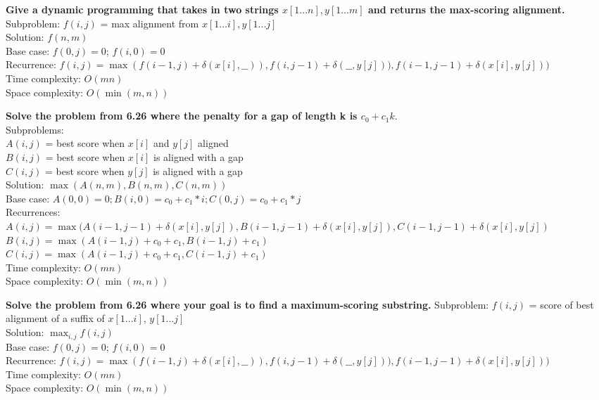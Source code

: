 \begin{problem}{6.26}
    \textbf{Give a dynamic programming that takes in two strings $x[1...n], y[1...m]$ and returns the max-scoring alignment.} \\
    Subproblem: $f(i, j)$ = max alignment from $x[1...i], y[1...j]$ \\
    Solution: $f(n, m)$ \\
    Base case: $f(0, j) = 0$; $f(i, 0) = 0$ \\
    Recurrence: $f(i, j) = \max(f(i - 1, j) + \delta(x[i],\_\_)), f(i, j - 1) + \delta(\_\_, y[j])), f(i - 1, j - 1) + \delta(x[i], y[j]))$ \\
    Time complexity: $O(mn)$ \\
    Space complexity: $O(\min(m, n))$
\end{problem}

\newpage
\begin{problem}{6.27}
    \textbf{Solve the problem from 6.26 where the penalty for a gap of length k is $c_0 + c_1k$}. \\
    Subproblems: 
        \\ $A(i, j)$ = best score when $x[i]$ and $y[j]$ aligned \\
        $B(i, j)$ = best score when $x[i]$ is aligned with a gap \\
        $C(i, j)$ = best score when $y[j]$ is aligned with a gap \\
    Solution: $\max(A(n, m), B(n, m), C(n, m))$ \\
    Base case: $A(0, 0) = 0; B(i, 0) = c_0 + c_1 * i; C(0, j) = c_0 + c_1 * j$ \\
    Recurrences: \\
    $A(i, j) = \max(A(i - 1, j - 1) + \delta(x[i], y[j]), B(i - 1, j - 1) + \delta(x[i], y[j]), C(i - 1, j - 1) + \delta(x[i], y[j])$ \\
    $B(i,  j) = \max(A(i - 1, j) + c_0 + c_1, B(i - 1, j) + c_1)$ \\
    $C(i,  j) = \max(A(i - 1, j) + c_0 + c_1, C(i - 1, j) + c_1)$ \\
    Time complexity: $O(mn)$ \\
    Space complexity: $O(\min(m, n))$
\end{problem}

\begin{problem}
    \textbf{Solve the problem from 6.26 where your goal is to find a maximum-scoring substring.}
    Subproblem: $f(i, j)$ = score of best alignment of a suffix of $x[1...i]$, $y[1...j]$ \\
    Solution: $\max_{i, j} f(i, j)$ \\
    Base case: $f(0, j) = 0$; $f(i, 0) = 0$ \\
    Recurrence: $f(i, j) = \max(f(i - 1, j) + \delta(x[i],\_\_)), f(i, j - 1) + \delta(\_\_, y[j])), f(i - 1, j - 1) + \delta(x[i], y[j]))$ \\
    Time complexity: $O(mn)$ \\
    Space complexity: $O(\min(m, n))$
\end{problem}
